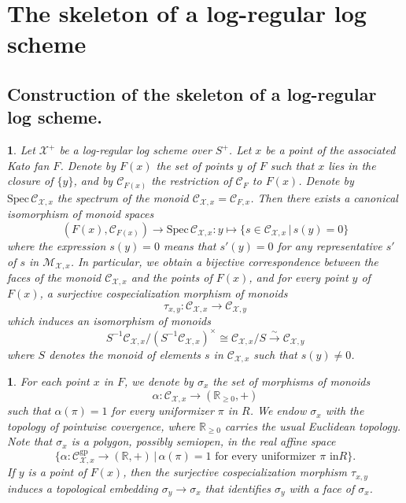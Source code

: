 \documentclass{amsart}%
\numberwithin{equation}{subsection}
\theoremstyle{plain2}
\theoremstyle{definition2}
\theoremstyle{stepstyle}
\theoremstyle{point}
\theoremstyle{subpoint}
\newtheorem{subpoint}[equation]{}%
\newcommand{\spa}[1]{\begin{subpoint}#1\end{subpoint}}           %
\newcommand{\R}{\ensuremath{\mathbb{R}}}
\newcommand{\cX}{\ensuremath{\mathscr{X}}}
\renewcommand{\R}{\ensuremath{\mathbb{R}}}
\newcommand{\Spec}{\ensuremath{\mathrm{Spec}\,}}
\newcommand{\gp}{\mathrm{gp}}
\begin{document}
\section{The skeleton of a log-regular log scheme} \label{sect skeleton log}
\subsection{Construction of the skeleton of a log-regular log scheme.}

\spa{Let $\cX^+$ be a log-regular log scheme over $S^+$. Let $x$ be a point of the associated Kato fan $F$. Denote by $F(x)$ the set of points
$y$ of $F$ such that $x$ lies in the closure of $\{y\}$, and by
$\mathcal{C}_{F(x)}$ the restriction of $\mathcal{C}_F$ to $F(x)$.
Denote
 by $\Spec \mathcal{C}_{\cX,x}$ the spectrum of the monoid
$\mathcal{C}_{\cX,x}=\mathcal{C}_{F,x}$. Then there exists a
canonical isomorphism of
 monoid spaces
$$(F(x),\mathcal{C}_{F(x)})\to \Spec \mathcal{C}_{\cX,x}:y\mapsto \{s\in \mathcal{C}_{\cX,x}\,|\,s(y)= 0\}$$ where the expression $s(y)= 0$ means that $s'(y)= 0$ for any representative $s'$ of $s$ in $\mathcal{M}_{\cX,x}$. In particular, we obtain a bijective correspondence between the faces of the monoid $\mathcal{C}_{\cX,x}$ and the points of $F(x)$, and for every point $y$ of $F(x)$, a surjective cospecialization morphism of monoids $$\tau_{x,y}:\mathcal{C}_{\cX,x}\to \mathcal{C}_{\cX,y}$$ which induces an isomorphism of monoids $$S^{-1}\mathcal{C}_{\cX,x}/(S^{-1}\mathcal{C}_{\cX,x})^{\times}\cong \mathcal{C}_{\cX,x}/S \xrightarrow{\sim}
 \mathcal{C}_{\cX,y}$$ where $S$ denotes the monoid of elements $s$ in $\mathcal{C}_{\cX,x}$ such that $s(y)\neq 0$.}

\spa{For each point $x$ in $F$, we denote by $\sigma_x$ the set of morphisms of monoids $$\alpha:\mathcal{C}_{\cX,x}\to (\R_{\geq 0},+)$$ such that $\alpha(\pi)=1$ for every uniformizer $\pi$ in $R$. We endow $\sigma_x$ with the topology of pointwise covergence, where $\R_{\geq 0}$ carries the usual Euclidean topology. Note that $\sigma_x$ is a polygon, possibly semiopen, in the real affine space
$$\{\alpha:\mathcal{C}^{\gp}_{\cX,x}\to (\R,+)\,|\,\alpha(\pi)=1\mbox{ for every uniformizer }\pi\mbox{ in
}R\}.$$ If $y$ is a point of $F(x)$, then the surjective
cospecialization morphism $\tau_{x,y}$ induces a topological
embedding $\sigma_y\to \sigma_x$ that identifies $\sigma_y$ with a face of $\sigma_x$.}
\end{document}
